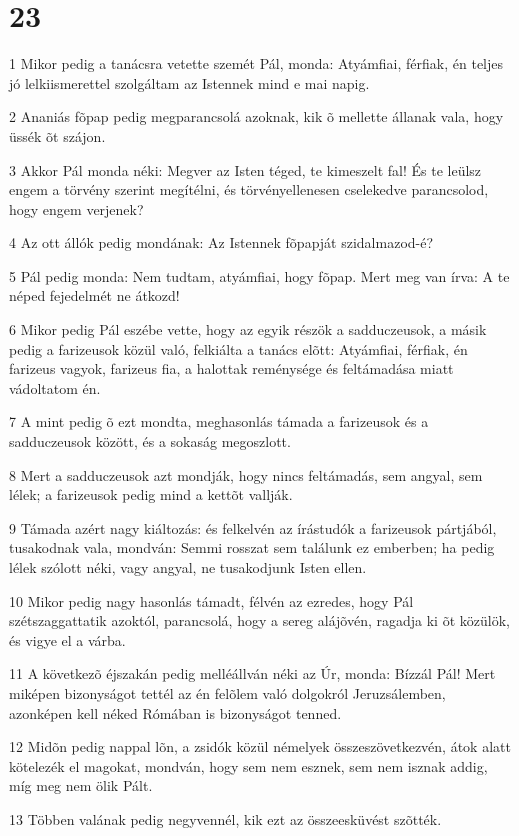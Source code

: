 \chapter{23}

\par 1 Mikor pedig a tanácsra vetette szemét Pál, monda: Atyámfiai, férfiak, én teljes jó lelkiismerettel szolgáltam az Istennek mind e mai napig.
\par 2 Ananiás fõpap pedig megparancsolá azoknak, kik õ mellette állanak vala, hogy üssék õt szájon.
\par 3 Akkor Pál monda néki: Megver az Isten téged, te kimeszelt fal! És te leülsz engem a törvény  szerint megítélni, és törvényellenesen cselekedve parancsolod, hogy engem verjenek?
\par 4 Az ott állók pedig mondának: Az Istennek fõpapját szidalmazod-é?
\par 5 Pál pedig monda: Nem tudtam, atyámfiai, hogy fõpap. Mert meg van írva: A te néped fejedelmét ne átkozd!
\par 6 Mikor pedig Pál eszébe vette, hogy az egyik részök a sadduczeusok, a másik pedig a farizeusok közül való, felkiálta a tanács elõtt: Atyámfiai, férfiak, én farizeus vagyok, farizeus fia, a halottak reménysége és feltámadása miatt vádoltatom én.
\par 7 A mint pedig õ ezt mondta, meghasonlás támada a farizeusok és a sadduczeusok között, és a sokaság megoszlott.
\par 8 Mert a sadduczeusok azt mondják, hogy nincs feltámadás, sem angyal, sem lélek; a farizeusok pedig mind a kettõt vallják.
\par 9 Támada azért nagy kiáltozás: és felkelvén az írástudók a farizeusok pártjából, tusakodnak vala, mondván: Semmi rosszat sem találunk ez emberben; ha pedig lélek szólott néki, vagy angyal, ne tusakodjunk Isten ellen.
\par 10 Mikor pedig nagy hasonlás támadt, félvén az ezredes, hogy Pál szétszaggattatik azoktól, parancsolá, hogy a sereg alájõvén, ragadja ki õt közülök, és vigye el a várba.
\par 11 A következõ éjszakán pedig melléállván néki az Úr, monda: Bízzál Pál! Mert miképen bizonyságot tettél az én felõlem való dolgokról Jeruzsálemben, azonképen kell néked Rómában  is bizonyságot tenned.
\par 12 Midõn pedig nappal lõn, a zsidók közül némelyek összeszövetkezvén, átok alatt kötelezék el magokat, mondván, hogy sem nem esznek, sem nem isznak addig, míg meg nem ölik Pált.
\par 13 Többen valának pedig negyvennél, kik ezt az összeesküvést szõtték.
